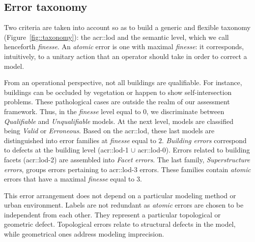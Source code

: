 \documentclass[conference]{IEEEtran}
\begin{document}
\subsection{Error taxonomy}
	Two criteria are taken into account so as to build a generic and flexible taxonomy (Figure~\ref{fig::taxonomy}): the \acrshort{acr::lod} and the semantic level, which we call henceforth \textit{finesse}. An \textit{atomic} error is one with maximal \textit{finesse}: it corresponds, intuitively, to a unitary action that an operator should take in order to correct a model.
    
    From an operational perspective, not all buildings are qualifiable. For instance, buildings can be occluded by vegetation or happen to show self-intersection problems. These pathological cases are outside the realm of our assessment framework. Thus, in the \textit{finesse} level equal to $0$, we discriminate between \textit{Qualifiable} and \textit{Unqualifiable} models. At the next level, models are classified being \textit{Valid} or \textit{Erroneous}. Based on the \acrshort{acr::lod}, these last models are distinguished into error families at \textit{finesse} equal to $2$. \textit{Building errors} correspond to defects at the building level (\acrshort{acr::lod}-1 $\cup$ \acrshort{acr::lod}-0). Errors related to building facets (\acrshort{acr::lod}-2) are assembled into \textit{Facet errors}. The last family, \textit{Superstructure errors}, groups errors pertaining to \acrshort{acr::lod}-3 errors. These families contain \textit{atomic} errors that have a maximal \textit{finesse} equal to $3$.
    
    This error arrangement does not depend on a particular modeling method or urban environment. Labels are not redundant as \textit{atomic} errors are chosen to be independent from each other. They represent a particular topological or geometric defect. Topological errors relate to structural defects in the model, while geometrical ones address modeling imprecision. 
    
\end{document}
